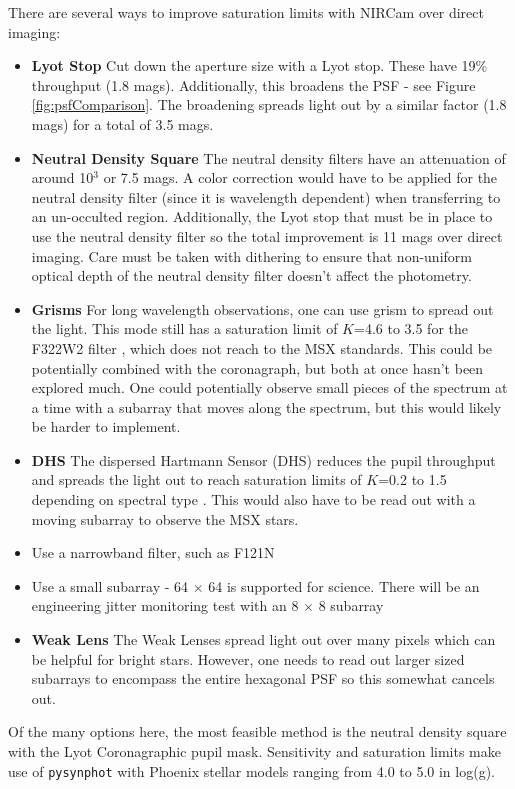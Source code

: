 \documentclass{aastex6}
\begin{document}
There are several ways to improve saturation limits with NIRCam over direct imaging:
\begin{itemize}
\item \textbf{Lyot Stop} Cut down the aperture size with a Lyot stop. These have 19\% throughput (1.8 mags). Additionally, this broadens the PSF - see Figure \ref{fig:psfComparison}.
The broadening spreads light out by a similar factor (1.8 mags) for a total of 3.5 mags.
\item \textbf{Neutral Density Square} The neutral density filters have an attenuation of around 10$^3$ or 7.5 mags. A color correction would have to be applied for the neutral density filter (since it is wavelength dependent) when transferring to an un-occulted region.
Additionally, the Lyot stop that must be in place to use the neutral density filter so the total improvement is 11 mags over direct imaging.
Care must be taken with dithering to ensure that non-uniform optical depth of the neutral density filter doesn't affect the photometry.
\item \textbf{Grisms} For long wavelength observations, one can use grism to spread out the light. This mode still has a saturation limit of $K$=4.6 to 3.5 for the F322W2  filter \citep{greene2016wfss}, which does not reach to the MSX standards. This could be potentially combined with the coronagraph, but both at once hasn't been explored much. One could potentially observe small pieces of the spectrum at a time with a subarray that moves along the spectrum, but this would likely be harder to implement.
\item \textbf{DHS} The dispersed Hartmann Sensor (DHS) reduces the pupil throughput and spreads the light out to reach saturation limits of $K$=0.2 to 1.5 depending on spectral type \citep{schlawin2017dhs}. This would also have to be read out with a moving subarray to observe the MSX stars.
\item Use a narrowband filter, such as F121N
\item Use a small subarray - 64 $\times$ 64 is supported for science. There will be an engineering jitter monitoring test with an 8 $\times$ 8 subarray 
\item \textbf{Weak Lens} The Weak Lenses spread light out over many pixels which can be helpful for bright stars. However, one needs to read out larger sized subarrays to encompass the entire hexagonal PSF so this somewhat cancels out.
\end{itemize}

Of the many options here, the most feasible method is the neutral density square with the Lyot Coronagraphic pupil mask.
Sensitivity and saturation limits make use of \texttt{pysynphot} \citep{lim2015pysynphot} with Phoenix stellar models \citep{allard2012phoenix} ranging from 4.0 to 5.0 in log(g).
\end{document}
